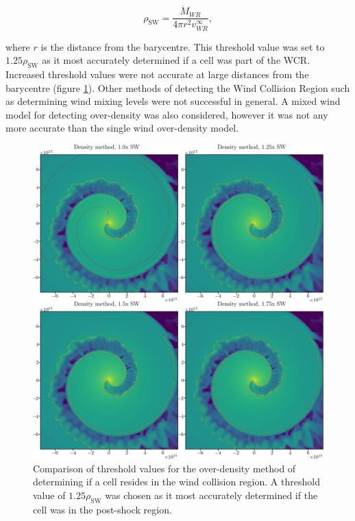 \begin{equation}
  \rho_\text{SW} = \frac{\dot{M}_{WR}}{4 \pi r^2 v^\infty_{WR}},
\end{equation}

\noindent
where $r$ is the distance from the barycentre. This threshold value was set to $1.25\rho_\text{SW}$ as it most accurately determined if a cell was part of the WCR.
Increased threshold values were not accurate at large distances from the barycentre (figure \ref{fig:overdensity-threshold}).
Other methods of detecting the Wind Collision Region such as determining wind mixing levels were not successful in general.
A mixed wind model for detecting over-density was also considered, however it was not any more accurate than the single wind over-density model. 

\begin{figure}
  \centering
  \includegraphics[width=5in]{assets/overdensity-method.png}
  \caption[Comparison of threshold values for over-density method]{Comparison of threshold values for the over-density method of determining if a cell resides in the wind collision region.
  A threshold value of $1.25\rho_\text{SW}$ was chosen as it most accurately determined if the cell was in the post-shock region.}
  \label{fig:overdensity-threshold}
\end{figure}

